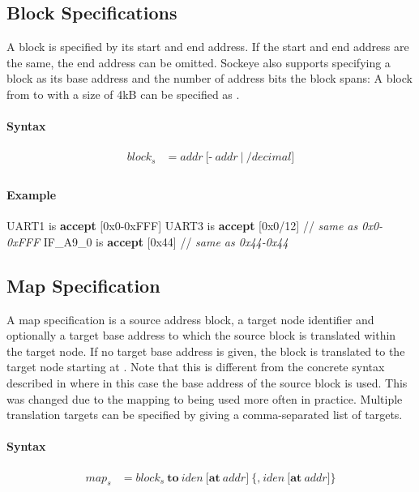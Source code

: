 \documentclass[a4paper,11pt,twoside]{report}
\begin{document}
{{{\subsection{Block Specifications}
A block is specified by its start and end address.
If the start and end address are the same, the end address can be omitted.
Sockeye also supports specifying a block as its base address and the number of address bits the block spans:
A block from  to  with a size of 4kB can be specified as .

\paragraph{Syntax}
\begin{align*}
\textit{block}_s & \mathop{=} \textit{addr}\
    \Big[
        \textbf{-}\ \textit{addr}\ 
    \Big|\
        \textbf{/}\textit{decimal}
    \Big] \\
\end{align*}

\paragraph{Example}
\begin{syntax}
    UART1 is \textbf{accept} [0x0-0xFFF]
    UART3 is \textbf{accept} [0x0/12]    // \textit{same as \textup{0x0-0xFFF}}
    IF_A9_0 is \textbf{accept} [0x44]      // \textit{same as \textup{0x44-0x44}}
\end{syntax}

\subsection{Map Specification}
A map specification is a source address block, a target node identifier and optionally a target base address to which the source block is translated within the target node.
If no target base address is given, the block is translated to the target node starting at .
Note that this is different from the concrete syntax described in \cite{achermann:mars17} where in this case the base address of the source block is used.
This was changed due to the mapping to \Sockeye{0x0} being used more often in practice.
Multiple translation targets can be specified by giving a comma-separated list of targets.

\paragraph{Syntax}
\begin{align*}
\textit{map}_s & \mathop{=}
\textit{block}_s\ \textbf{to}\ \textit{iden}\ 
    \Big[
        \textbf{at}\ \textit{addr}
    \Big]\
    \Big\{
        \textbf{,}\ \textit{iden}\ 
        \Big[
            \textbf{at}\ \textit{addr}
        \Big]
    \Big\}\\
\end{align*}

}}}
\end{document}
